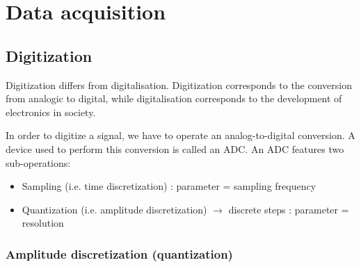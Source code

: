 \section{Data acquisition}

\subsection{Digitization}

Digitization differs from digitalisation. Digitization corresponds to the conversion from analogic to digital, while digitalisation corresponds to the development of electronics in society.

In order to digitize a signal, we have to operate an analog-to-digital conversion. A device used to perform this conversion is called an ADC. An ADC features two sub-operations:

\begin{itemize}
    \item Sampling (i.e. time discretization) : parameter = sampling frequency
    \item Quantization (i.e. amplitude discretization) $\rightarrow$ discrete steps : parameter = resolution
\end{itemize}

\subsubsection{Amplitude discretization (quantization)}



